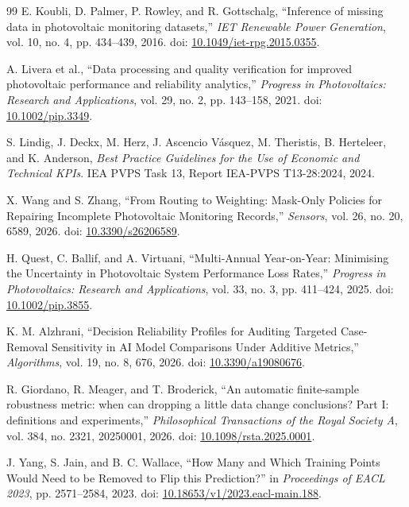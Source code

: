 \documentclass[preprint,12pt]{elsarticle}
\begin{document}
\begin{thebibliography}{99}
E. Koubli, D. Palmer, P. Rowley, and R. Gottschalg, ``Inference of missing data in photovoltaic monitoring datasets,'' \emph{IET Renewable Power Generation}, vol. 10, no. 4, pp. 434--439, 2016. doi: \href{https://doi.org/10.1049/iet-rpg.2015.0355}{10.1049/iet-rpg.2015.0355}.

A. Livera et al., ``Data processing and quality verification for improved photovoltaic performance and reliability analytics,'' \emph{Progress in Photovoltaics: Research and Applications}, vol. 29, no. 2, pp. 143--158, 2021. doi: \href{https://doi.org/10.1002/pip.3349}{10.1002/pip.3349}.

S. Lindig, J. Deckx, M. Herz, J. Ascencio V\'{a}squez, M. Theristis, B. Herteleer, and K. Anderson, \emph{Best Practice Guidelines for the Use of Economic and Technical KPIs}. IEA PVPS Task 13, Report IEA-PVPS T13-28:2024, 2024.

X. Wang and S. Zhang, ``From Routing to Weighting: Mask-Only Policies for Repairing Incomplete Photovoltaic Monitoring Records,'' \emph{Sensors}, vol. 26, no. 20, 6589, 2026. doi: \href{https://doi.org/10.3390/s26206589}{10.3390/s26206589}.

H. Quest, C. Ballif, and A. Virtuani, ``Multi-Annual Year-on-Year: Minimising the Uncertainty in Photovoltaic System Performance Loss Rates,'' \emph{Progress in Photovoltaics: Research and Applications}, vol. 33, no. 3, pp. 411--424, 2025. doi: \href{https://doi.org/10.1002/pip.3855}{10.1002/pip.3855}.

K. M. Alzhrani, ``Decision Reliability Profiles for Auditing Targeted Case-Removal Sensitivity in AI Model Comparisons Under Additive Metrics,'' \emph{Algorithms}, vol. 19, no. 8, 676, 2026. doi: \href{https://doi.org/10.3390/a19080676}{10.3390/a19080676}.

R. Giordano, R. Meager, and T. Broderick, ``An automatic finite-sample robustness metric: when can dropping a little data change conclusions? Part I: definitions and experiments,'' \emph{Philosophical Transactions of the Royal Society A}, vol. 384, no. 2321, 20250001, 2026. doi: \href{https://doi.org/10.1098/rsta.2025.0001}{10.1098/rsta.2025.0001}.

J. Yang, S. Jain, and B. C. Wallace, ``How Many and Which Training Points Would Need to be Removed to Flip this Prediction?'' in \emph{Proceedings of EACL 2023}, pp. 2571--2584, 2023. doi: \href{https://doi.org/10.18653/v1/2023.eacl-main.188}{10.18653/v1/2023.eacl-main.188}.


\end{thebibliography}
\end{document}

